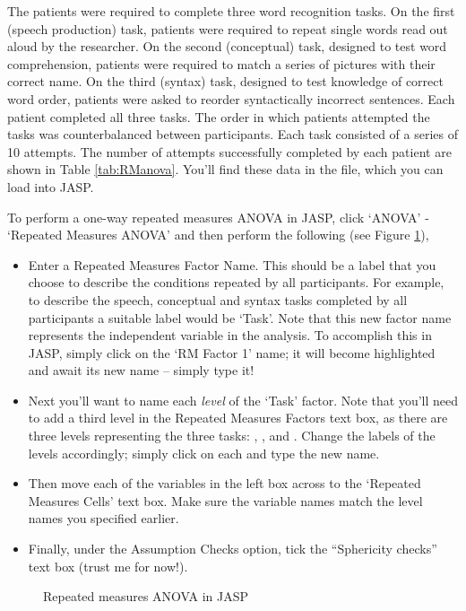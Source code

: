 The patients were required to complete three word recognition tasks. On the first (speech production) task, patients were required to repeat single words read out aloud by the researcher. On the second (conceptual) task, designed to test word comprehension, patients were required to match a series of pictures with their correct name. On the third (syntax) task, designed to test knowledge of correct word order, patients were asked to reorder syntactically incorrect sentences. Each patient completed all three tasks. The order in which patients attempted the tasks was counterbalanced between participants. Each task consisted of a series of 10 attempts. The number of attempts successfully completed by each patient are shown in Table \ref{tab:RManova}. You'll find these data in the  file, which you can load into JASP. 

To perform a one-way repeated measures ANOVA in JASP, click `ANOVA' - `Repeated Measures ANOVA' and then perform the following (see Figure \ref{fig:RManova1}), 
 
\begin{itemize} \itemsep -2pt
\item Enter a Repeated Measures Factor Name. This should be a label that you choose to describe the conditions repeated by all participants. For example, to describe the speech, conceptual and syntax tasks completed by all participants a suitable label would be ‘Task’. Note that this new factor name represents the independent variable in the analysis. To accomplish this in JASP, simply click on the `RM Factor 1' name; it will become highlighted and await its new name -- simply type it! 
\item Next you'll want to name each \emph{level} of the `Task' factor. Note that you'll need to add a third level in the Repeated Measures Factors text box, as there are three levels representing the three tasks: , , and . Change the labels of the levels accordingly; simply click on each and type the new name.
\item Then move each of the variables in the left box across to the `Repeated Measures Cells' text box.  Make sure the variable names match the level names you specified earlier.
\item Finally, under the Assumption Checks option, tick the “Sphericity checks” text box (trust me for now!).
\end{itemize}

\begin{figure}[!htb]
\begin{center}
\caption{Repeated measures ANOVA in JASP}
\HR
\label{fig:RManova1}
\end{center}
\end{figure}

